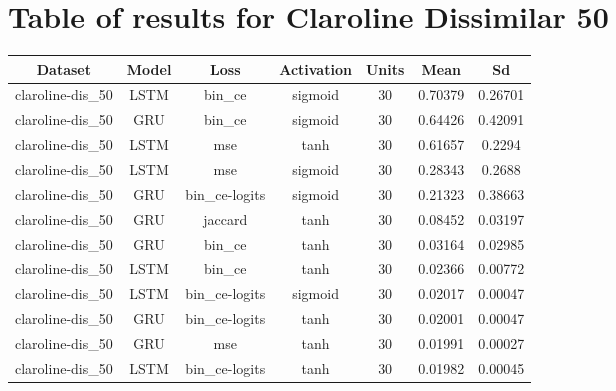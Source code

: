 \documentclass{article}%
\begin{document}
%
\newpage%
\section{Table of results for Claroline Dissimilar 50}%
\label{sec:TableofresultsforClarolineDissimilar50}%
\begin{longtable}{|c|c|c|c|c|c|c|}%
\hline%
\rowcolor{lightgray!70}%
\textbf{Dataset}&\textbf{Model}&\textbf{Loss}&\textbf{Activation}&\textbf{Units}&\textbf{Mean}&\textbf{Sd}\\%
\hline%
claroline{-}dis\_50&LSTM&bin\_ce&sigmoid&30&0.70379&0.26701\\%
\hline%
claroline{-}dis\_50&GRU&bin\_ce&sigmoid&30&0.64426&0.42091\\%
\hline%
claroline{-}dis\_50&LSTM&mse&tanh&30&0.61657&0.2294\\%
\hline%
claroline{-}dis\_50&LSTM&mse&sigmoid&30&0.28343&0.2688\\%
\hline%
claroline{-}dis\_50&GRU&bin\_ce{-}logits&sigmoid&30&0.21323&0.38663\\%
\hline%
claroline{-}dis\_50&GRU&jaccard&tanh&30&0.08452&0.03197\\%
\hline%
claroline{-}dis\_50&GRU&bin\_ce&tanh&30&0.03164&0.02985\\%
\hline%
claroline{-}dis\_50&LSTM&bin\_ce&tanh&30&0.02366&0.00772\\%
\hline%
claroline{-}dis\_50&LSTM&bin\_ce{-}logits&sigmoid&30&0.02017&0.00047\\%
\hline%
claroline{-}dis\_50&GRU&bin\_ce{-}logits&tanh&30&0.02001&0.00047\\%
\hline%
claroline{-}dis\_50&GRU&mse&tanh&30&0.01991&0.00027\\%
\hline%
claroline{-}dis\_50&LSTM&bin\_ce{-}logits&tanh&30&0.01982&0.00045\\%
\hline%
\end{longtable}

%
\newpage%
\end{document}
